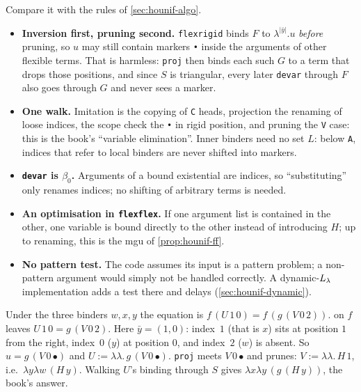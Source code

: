 Compare it with the rules of \cref{sec:hounif-algo}.
\begin{itemize}
  \item \textbf{Inversion first, pruning second.} \texttt{flexrigid} binds $F$ to $\lambda^{|\bar y|}.u$ \emph{before}
    pruning, so $u$ may still contain markers \texttt{•} inside the arguments of other flexible terms. That is
    harmless: \texttt{proj} then binds each such $G$ to a term that drops those positions, and since $S$ is
    triangular, every later \texttt{devar} through $F$ also goes through $G$ and never sees a marker.%
  \item \textbf{One walk.} Imitation is the copying of \texttt{C} heads, projection the renaming of loose
    indices, the scope check the \texttt{•} in rigid position, and pruning the \texttt{V} case: this is the
    book's \enquote{variable elimination}. Inner binders need no set $L$: below \texttt{A}, indices that refer to
    local binders are never shifted into markers.
  \item \textbf{\texttt{devar} is $\beta_0$.} Arguments of a bound existential are indices, so
    \enquote{substituting} only renames indices; no shifting of arbitrary terms is needed.
  \item \textbf{An optimisation in \texttt{flexflex}.} If one argument list is contained in the other, one variable
    is bound directly to the other instead of introducing $H$; up to renaming, this is the mgu of
    \cref{prop:hounif-ff}.
  \item \textbf{No pattern test.} The code assumes its input is a pattern problem; a non-pattern argument would
    simply not be handled correctly. A dynamic-$L_\lambda$ implementation adds a test there and delays
    (\cref{sec:hounif-dynamic}).
\end{itemize}

\begin{tutorial}
Under the three binders $w,x,y$ the equation is $f\,(U\,1\,0)=f\,(g\,(V\,0\,2))$.  on $f$ leaves
$U\,1\,0=g\,(V\,0\,2)$. Here $\bar y=(1,0)$: index~$1$ (that is $x$) sits at position $1$ from the right, index~$0$
($y$) at position $0$, and index~$2$ ($w$) is absent. So $u=g\,(V\,0\,\text{•})$ and $U:=\lambda\lambda.\,g\,(V\,0\,\text{•})$.
\texttt{proj} meets $V\,0\,\text{•}$ and prunes: $V:=\lambda\lambda.\,H\,1$, i.e.\ $\lambda y\lambda w\,(H\,y)$. Walking $U$'s
binding through $S$ gives $\lambda x\lambda y\,(g\,(H\,y))$, the book's answer.
\end{tutorial}

